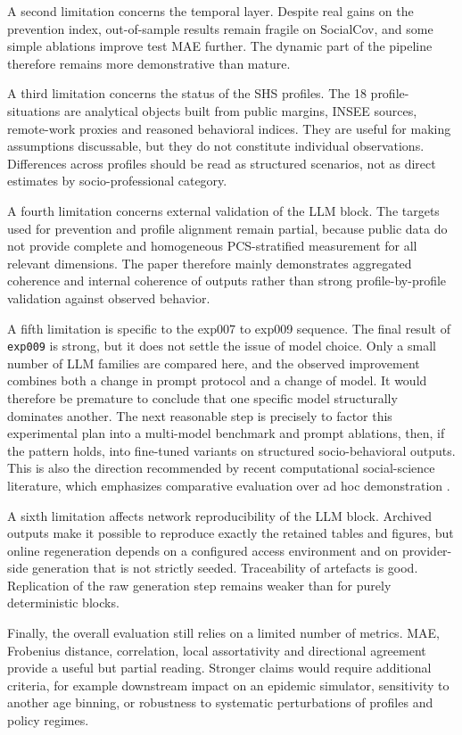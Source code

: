 \documentclass[ROIA,Unicode]{cedram}
\begin{document}
A second limitation concerns the temporal layer. Despite real gains on the prevention index, out-of-sample results remain fragile on SocialCov, and some simple ablations improve test MAE further. The dynamic part of the pipeline therefore remains more demonstrative than mature.

A third limitation concerns the status of the SHS profiles. The 18 profile-situations are analytical objects built from public margins, INSEE sources, remote-work proxies and reasoned behavioral indices. They are useful for making assumptions discussable, but they do not constitute individual observations. Differences across profiles should be read as structured scenarios, not as direct estimates by socio-professional category.

A fourth limitation concerns external validation of the LLM block. The targets used for prevention and profile alignment remain partial, because public data do not provide complete and homogeneous PCS-stratified measurement for all relevant dimensions. The paper therefore mainly demonstrates aggregated coherence and internal coherence of outputs rather than strong profile-by-profile validation against observed behavior.

A fifth limitation is specific to the exp007 to exp009 sequence. The final result of \texttt{exp009} is strong, but it does not settle the issue of model choice. Only a small number of LLM families are compared here, and the observed improvement combines both a change in prompt protocol and a change of model. It would therefore be premature to conclude that one specific model structurally dominates another. The next reasonable step is precisely to factor this experimental plan into a multi-model benchmark and prompt ablations, then, if the pattern holds, into fine-tuned variants on structured socio-behavioral outputs. This is also the direction recommended by recent computational social-science literature, which emphasizes comparative evaluation over ad hoc demonstration \citep{ziems2024css}.

A sixth limitation affects network reproducibility of the LLM block. Archived outputs make it possible to reproduce exactly the retained tables and figures, but online regeneration depends on a configured access environment and on provider-side generation that is not strictly seeded. Traceability of artefacts is good. Replication of the raw generation step remains weaker than for purely deterministic blocks.

Finally, the overall evaluation still relies on a limited number of metrics. MAE, Frobenius distance, correlation, local assortativity and directional agreement provide a useful but partial reading. Stronger claims would require additional criteria, for example downstream impact on an epidemic simulator, sensitivity to another age binning, or robustness to systematic perturbations of profiles and policy regimes.
\end{document}
